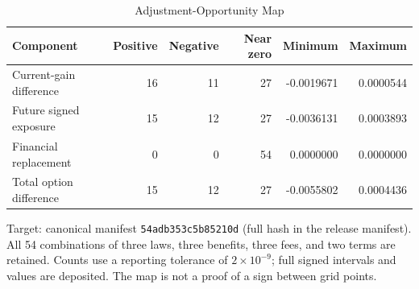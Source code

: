 \begin{table}[t]
\caption{Adjustment-Opportunity Map}\label{tab:mechanism}
\centering
\footnotesize
\begin{tabular}{@{}lrrrrr@{}}
\toprule
Component & Positive & Negative & Near zero & Minimum & Maximum \\
\midrule
Current-gain difference & 16 & 11 & 27 & -0.0019671 & 0.0000544 \\
Future signed exposure & 15 & 12 & 27 & -0.0036131 & 0.0003893 \\
Financial replacement & 0 & 0 & 54 & 0.0000000 & 0.0000000 \\
Total option difference & 15 & 12 & 27 & -0.0055802 & 0.0004436 \\
\bottomrule
\end{tabular}
\par\smallskip\begin{minipage}{\linewidth}\footnotesize Target: canonical manifest \texttt{54adb353c5b85210d} (full hash in the release manifest). All 54 combinations of three laws, three benefits, three fees, and two terms are retained. Counts use a reporting tolerance of $2\times10^{-9}$; full signed intervals and values are deposited. The map is not a proof of a sign between grid points.\end{minipage}
\end{table}
